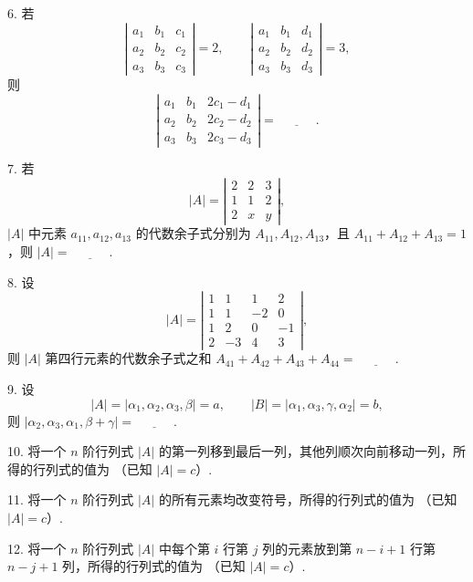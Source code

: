 \documentclass[UTF8,12pt,a4paper,fontset=fandol]{ctexart}
\begin{document}
6. 若
\[
\left|\begin{array}{ccc}
a_1&b_1&c_1\\
a_2&b_2&c_2\\
a_3&b_3&c_3
\end{array}\right|=2,\qquad
\left|\begin{array}{ccc}
a_1&b_1&d_1\\
a_2&b_2&d_2\\
a_3&b_3&d_3
\end{array}\right|=3,
\]
则
\[
\left|\begin{array}{ccc}
a_1&b_1&2c_1-d_1\\
a_2&b_2&2c_2-d_2\\
a_3&b_3&2c_3-d_3
\end{array}\right|=\underline{\hspace{3em}}.
\]

7. 若
\[
|A|=\left|\begin{array}{ccc}
2&2&3\\
1&1&2\\
2&x&y
\end{array}\right|,
\]
$|A|$ 中元素 $a_{11},a_{12},a_{13}$ 的代数余子式分别为 $A_{11},A_{12},A_{13}$，且
$A_{11}+A_{12}+A_{13}=1$，则 $|A|=\underline{\hspace{3em}}$.

8. 设
\[
|A|=\left|\begin{array}{cccc}
1&1&1&2\\
1&1&-2&0\\
1&2&0&-1\\
2&-3&4&3
\end{array}\right|,
\]
则 $|A|$ 第四行元素的代数余子式之和 $A_{41}+A_{42}+A_{43}+A_{44}=\underline{\hspace{3em}}$.

9. 设
\[
|A|=|\alpha_1,\alpha_2,\alpha_3,\beta|=a,\qquad
|B|=|\alpha_1,\alpha_3,\gamma,\alpha_2|=b,
\]
则 $|\alpha_2,\alpha_3,\alpha_1,\beta+\gamma|=\underline{\hspace{3em}}$.

10. 将一个 $n$ 阶行列式 $|A|$ 的第一列移到最后一列，其他列顺次向前移动一列，所得的行列式的值为
\underline{\hspace{3em}}（已知 $|A|=c$）.

11. 将一个 $n$ 阶行列式 $|A|$ 的所有元素均改变符号，所得的行列式的值为
\underline{\hspace{3em}}（已知 $|A|=c$）.

12. 将一个 $n$ 阶行列式 $|A|$ 中每个第 $i$ 行第 $j$ 列的元素放到第 $n-i+1$ 行第 $n-j+1$ 列，所得的行列式的值为
\underline{\hspace{3em}}（已知 $|A|=c$）.
\end{document}
